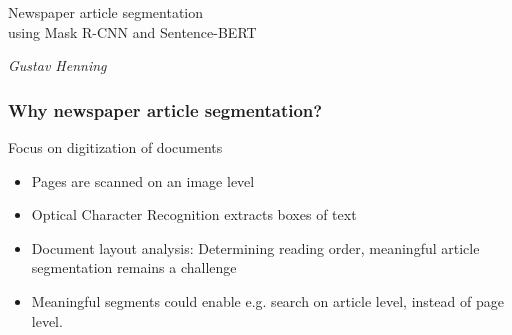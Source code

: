 \documentclass[aspectratio=1610]{beamer}
\begin{document}
\startpage
\begin{frame}

  \vspace{0.02\textheight}
  
  \begin{Large}
    Newspaper article segmentation \\
    using Mask R-CNN and Sentence-BERT
  \end{Large}



  \vspace{0.1\textheight}

  \begin{small}
    \textit{Gustav Henning}
  \end{small}
\end{frame}


\normalpage
\begin{frame}
  \frametitle{Why newspaper article segmentation?}

  \begin{block}{Focus on digitization of documents}
    \begin{itemize}
    \item Pages are scanned on an image level
    \item Optical Character Recognition extracts boxes of text
    \item Document layout analysis: Determining reading order, meaningful article segmentation remains a challenge
    \item Meaningful segments could enable e.g. search on article level, instead of page level.
    \end{itemize}
  \end{block}

\end{frame}
\normalpage
\end{document}

